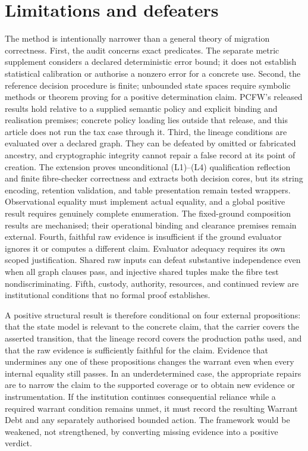 \documentclass[twocolumn,envcountsect,envcountsame,natbib]{svjour3}
\begin{document}
\section{Limitations and defeaters}\label{ex:sec:limitations}
The method is intentionally narrower than a general theory of migration correctness. First, the audit concerns exact predicates. The separate metric supplement considers a declared deterministic error bound; it does not establish statistical calibration or authorise a nonzero error for a concrete use. Second, the reference decision procedure is finite; unbounded state spaces require symbolic methods or theorem proving for a positive determination claim. PCFW's released results hold relative to a supplied semantic policy and explicit binding and realisation premises; concrete policy loading lies outside that release, and this article does not run the tax case through it. Third, the lineage conditions are evaluated over a declared graph. They can be defeated by omitted or fabricated ancestry, and cryptographic integrity cannot repair a false record at its point of creation. The extension proves unconditional (L1)--(L4) qualification reflection and finite fibre-checker correctness and extracts both decision cores, but its string encoding, retention validation, and table presentation remain tested wrappers. Observational equality must implement actual equality, and a global positive result requires genuinely complete enumeration. The fixed-ground composition results are mechanised; their operational binding and clearance premises remain external. Fourth, faithful raw evidence is insufficient if the ground evaluator ignores it or computes a different claim. Evaluator adequacy requires its own scoped justification. Shared raw inputs can defeat substantive independence even when all graph clauses pass, and injective shared tuples make the fibre test nondiscriminating. Fifth, custody, authority, resources, and continued review are institutional conditions that no formal proof establishes.

A positive structural result is therefore conditional on four external propositions: that the state model is relevant to the concrete claim, that the carrier covers the asserted transition, that the lineage record covers the production paths used, and that the raw evidence is sufficiently faithful for the claim. Evidence that undermines any one of these propositions changes the warrant even when every internal equality still passes. In an underdetermined case, the appropriate repairs are to narrow the claim to the supported coverage or to obtain new evidence or instrumentation. If the institution continues consequential reliance while a required warrant condition remains unmet, it must record the resulting Warrant Debt and any separately authorised bounded action. The framework would be weakened, not strengthened, by converting missing evidence into a positive verdict.
\end{document}
